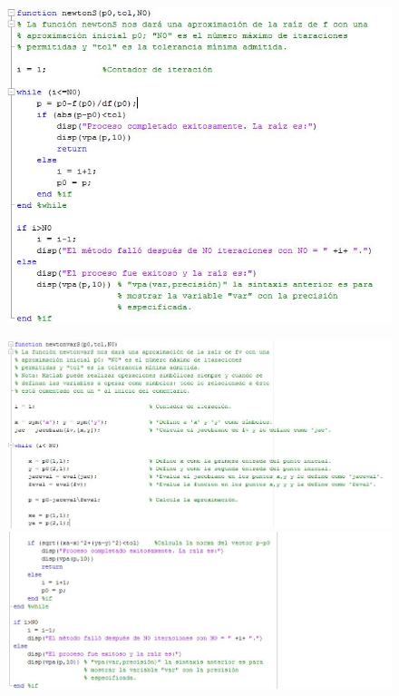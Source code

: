 \begin{figure}[h!]
\centering
  \includegraphics[width=1\textwidth]{NewtonC.JPG}
\end{figure} 

\begin{figure}[h!]
\centering
  \includegraphics[width=1.2\textwidth]{NewtonVarC1.JPG}
  \includegraphics[width=1.2\textwidth]{NewtonVarC2.JPG}
\end{figure} 